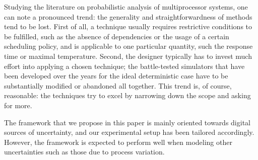 Studying the literature on probabilistic analysis of multiprocessor systems, one
can note a pronounced trend: the generality and straightforwardness of 
methods tend to be lost. First of all, a technique usually requires restrictive
conditions to be fulfilled, such as the absence of dependencies or the usage of
a certain scheduling policy, and is applicable to one particular quantity, such
the response time or maximal temperature. Second, the designer typically has to
invest much effort into applying a chosen technique; the battle-tested
simulators that have been developed over the years for the ideal deterministic
case have to be substantially modified or abandoned all together. This trend is,
of course, reasonable: the techniques try to excel by narrowing down the scope
and asking for more.

The framework that we propose in this paper is mainly oriented towards digital
sources of uncertainty, and our experimental setup has been tailored
accordingly. However, the framework is expected to perform well when modeling
other uncertainties such as those due to process variation.

